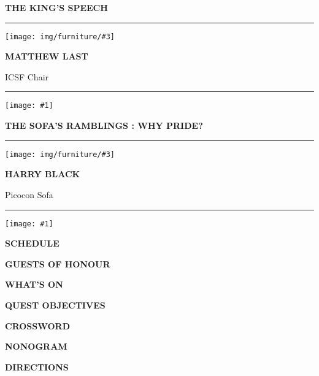 \documentclass[12pt]{article}
\newcommand{\tombstone}[1]{%
  \texttt{[image: \#1]}%
}
\newcommand{\altf}[1]{{\robotocondensed\textbf{\uppercase{#1}}}}
\newcommand{\decorated}[1]{\altf{\textbullet{} #1 \textbullet{}}}
\newcommand{\head}[1]{%
  \begin{center}
    {\Huge\decorated{#1}}
  \end{center}%
}
\newcommand{\article}[3]{%
  \vspace{2.5em}\hrule
  \begin{center}
    \centering
  \begin{minipage}{0.15\textwidth}
    \texttt{[image: img/furniture/\#3]}
  \end{minipage}\hspace{1em}
  \begin{minipage}{0.3\textwidth}
    {\Large \altf{#1}\par}\vspace{-0.7\baselineskip} #2
  \end{minipage}
  \end{center}
  \vspace{1em}\hrule\vspace{1.5em}
  \tombstone{img/tombstone/sci-fi}
  \par\hfill
}
\begin{document}
%

\clearpage
%
\head{The King's Speech}
\article{Matthew Last}{ICSF Chair}{chair}
\clearpage

\head{The Sofa's Ramblings : Why Pride?}
\article{Harry Black}{Picocon Sofa}{sofa}
\clearpage
%
\head{Schedule}

\clearpage
%
\head{Guests of Honour}

\clearpage

\head{What's On}

\clearpage

\head{Quest Objectives}


\clearpage

\head{Crossword}


\clearpage

\head{Nonogram}

\vfill

\vfill
\clearpage

\head{Directions}

\end{document}
